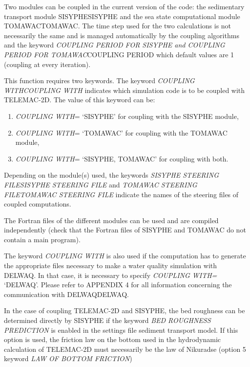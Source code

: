 \documentclass{article} %
\begin{document}
 Two modules can be coupled in the current version of the code: the sedimentary transport module SISYPHESISYPHE and the sea state computational module TOMAWACTOMAWAC. The time step used for the two calculations is not necessarily the same and is managed automatically by the coupling algorithms and the keyword \textit{COUPLING PERIOD FOR SISYPHE and COUPLING PERIOD FOR TOMAWAC}COUPLING PERIOD which default values are 1 (coupling at every iteration).

 This function requires two keywords. The keyword \textit{COUPLING WITHCOUPLING WITH} indicates which simulation code is to be coupled with TELEMAC-2D. The value of this keyword can be:

\begin{enumerate}
\item  \textit{COUPLING WITH}= `SISYPHE' for coupling with the SISYPHE module,

\item  \textit{COUPLING WITH}= `TOMAWAC' for coupling with the TOMAWAC module,

\item  \textit{COUPLING WITH}= `SISYPHE, TOMAWAC' for coupling with both.
\end{enumerate}

 Depending on the module(s) used, the keywords \textit{SISYPHE STEERING FILESISYPHE STEERING FILE }and\textit{ TOMAWAC STEERING FILETOMAWAC STEERING FILE} indicate the names of the steering files of coupled computations.

 The Fortran files of the different modules can be used and are compiled independently (check that the Fortran files of SISYPHE and TOMAWAC do not contain a main program).

 The keyword \textit{COUPLING WITH} is also used if the computation has to generate the appropriate files necessary to make a water quality simulation with DELWAQ. In that case, it is necessary to specify \textit{COUPLING WITH= }`DELWAQ'. Please refer to APPENDIX 4 for all information concerning the communication with DELWAQDELWAQ.

 In the case of coupling TELEMAC-2D and SISYPHE, the bed roughness can be determined directly by SISYPHE if the keyword \textit{BED ROUGHNESS PREDICTION }is enabled in the settings file sediment transport model. If this option is used, the friction law on the bottom used in the hydrodynamic calculation of TELEMAC-2D must necessarily be the law of Nikuradse (option 5 keyword \textit{LAW OF BOTTOM FRICTION})
\end{document}
